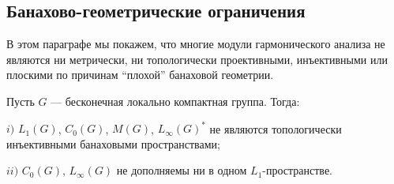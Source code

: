 
\subsection{Банахово-геометрические ограничения}
\label{SubSectionBanachGeometricRestriction}

В этом параграфе мы покажем, что многие модули гармонического анализа не являются ни метрически, ни топологически проективными, инъективными или плоскими по причинам ``плохой'' банаховой геометрии. 

\begin{proposition}\label{StdModAreNotRetrOfL1LInf} Пусть $G$ --- бесконечная локально компактная группа. Тогда:

$i)$ $L_1(G)$, $C_0(G)$, $M(G)$, $L_\infty(G)^*$ не являются топологически инъективными банаховыми пространствами;

$ii)$ $C_0(G)$, $L_\infty(G)$ не дополняемы ни в одном $L_1$-пространстве.
\end{proposition}
